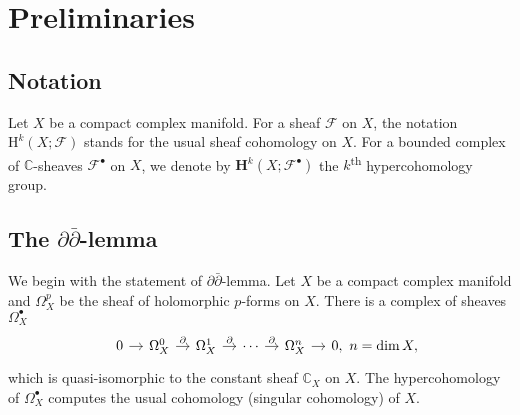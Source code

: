 \section{Preliminaries}
\subsection*{Notation}
Let \(X\) be a compact complex manifold. 
For a sheaf \(\mathscr{F}\) on \(X\), the
notation \(\mathrm{H}^{k}(X;\mathscr{F})\) stands for 
the usual sheaf cohomology on \(X\).
For a bounded complex of \(\mathbb{C}\)-sheaves \(\mathscr{F}^{\bullet}\) on \(X\),
we denote by \(\mathbf{H}^{k}(X;\mathscr{F}^{\bullet})\)
the \(k\)\textsuperscript{th} hypercohomology group.


\subsection{The \texorpdfstring{\(\partial\bar{\partial}\)}{}-lemma}
\label{subsection:ddbar-lemma}
We begin with the statement of \(\partial\bar{\partial}\)-lemma.
Let \(X\) be a compact complex manifold and 
\(\Omega_{X}^{p}\) be the sheaf of holomorphic \(p\)-forms on \(X\).
There is a complex of sheaves \(\Omega_{X}^{\bullet}\)
\begin{equation}
\label{equation:resolution-holomorphic}
\begin{tikzcd}[column sep=1em]
&0\ar[r]&\Omega_{X}^{0}\ar[r,"\partial"]&\Omega_{X}^{1}\ar[r,"\partial"]&\cdots
\ar[r,"\partial"]&\Omega_{X}^{n}\ar[r]&0,~n=\dim X,
\end{tikzcd}
\end{equation}
which is quasi-isomorphic to the constant sheaf \(\mathbb{C}_{X}\) on \(X\). 
The hypercohomology of \(\Omega_{X}^{\bullet}\) computes the 
usual cohomology (singular cohomology) of \(X\). 


